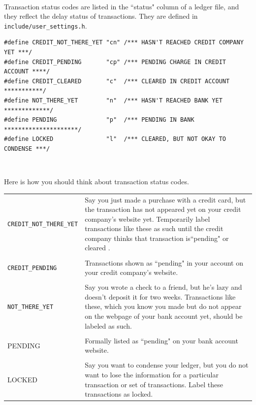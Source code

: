 \documentclass{article}
\providecommand{\q}{$\quad$ \newline}
\begin{document}
\begin{flushleft}
\paragraph{} Transaction status codes are listed in the ``status" column of a ledger file, and they reflect the delay status of transactions. They are defined in {\tt include/user\_settings.h}. \q

\begin{lstlisting}
#define CREDIT_NOT_THERE_YET "cn" /*** HASN'T REACHED CREDIT COMPANY YET ***/
#define CREDIT_PENDING       "cp" /*** PENDING CHARGE IN CREDIT ACCOUNT ****/
#define CREDIT_CLEARED       "c"  /*** CLEARED IN CREDIT ACCOUNT ***********/
#define NOT_THERE_YET        "n"  /*** HASN'T REACHED BANK YET *************/
#define PENDING              "p"  /*** PENDING IN BANK *********************/
#define LOCKED               "l"  /*** CLEARED, BUT NOT OKAY TO CONDENSE ***/
\end{lstlisting} \q

Here is how you should think about transaction status codes. \q

\begin{center}
\begin{tabular}{lp{11cm}}
 {\tt CREDIT\_NOT\_THERE\_YET} & Say you just made a purchase with a credit card, but the transaction has not appeared yet on your credit company's website yet. Temporarily label transactions like these as such until the credit company thinks  that transaction is``pending"  or cleared . \\ \\

{\tt CREDIT\_PENDING} & Transactions shown as ``pending" in your account on your credit company's website. \\ \\

{\tt NOT\_THERE\_YET} & Say you wrote a check to a friend, but he's lazy and doesn't deposit it for two weeks. Transactions like these, which you know you made but do not appear on the webpage of your bank account yet, should be labeled as such. \\ \\

PENDING & Formally listed as ``pending" on your bank account website. \\ \\

LOCKED & Say you want to condense your ledger, but you do not want to lose the information for a particular transaction or set of transactions. Label these transactions as locked.
 

\end{tabular}
\end{center}
\end{flushleft}
\end{document}
